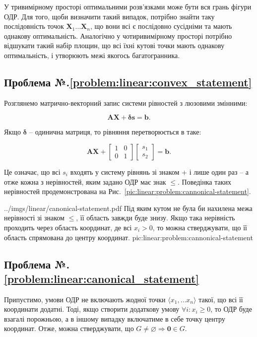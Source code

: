 \documentclass[\main/book.tex]{subfiles}
\begin{document}
У тривимірному просторі оптимальними розв'язками може бути вся грань фігури ОДР. Для того, щоби визначити такий випадок, потрібно знайти таку послідовність точок $\mathbf{X}_1 \ldots \mathbf{X}_n$, що вони всі є послідовно сусідніми та мають однакову оптимальність. Аналогічно у чотиривимірному просторі потрібно відшукати такий набір площин, що всі їхні кутові точки мають однакову оптимальність, і утворюють межі якогось багатогранника.

\subsection*{Проблема №.\ref{problem:linear:convex_statement}}

Розглянемо матрично-векторний запис системи рівностей з люзовими змінними:

\[
 \mathbf{A} \mathbf{X} + \mathbf{\delta} \mathbf{s} = \mathbf{b}
 \text{.}
\]

Якщо $\mathbf{\delta}$ -- одинична матриця, то рівняння перетворюється в таке:


\[
 \mathbf{A} \mathbf{X} +
 \left[
  \begin{array}{cc}
   1 & 0 \\
   0 & 1
  \end{array}
 \right]
 \left[
  \begin{array}{c}
   s_1 \\
   s_2
  \end{array}
 \right] = \mathbf{b}\text{.}
\]

Це означає, що всі $s_i$ входять у систему рівнянь зі знаком \flqq{}$+$\frqq{} і лише один раз -- а отже кожна з нерівностей, яким задано ОДР має знак \flqq{}$\leq$\frqq{}. Поведінка таких нерівностей продемонстрована на Рис.~\ref{pic:linear:problem:cannonical-statement}.

\illustration
 {../imgs/linear/canonical-statement.pdf}
 {Під яким кутом не була би нахилена межа нерівності зі знаком \flqq{}$\leq$\frqq{}, її область завжди буде знизу. Якщо така нерівність проходить через область координат, де всі $x_i > 0$, то можна стверджувати, що її область спрямована до центру координат.}
 {pic:linear:problem:cannonical-statement}

\subsection*{Проблема №.\ref{problem:linear:canonical_statement}}

Припустимо, умови ОДР не включають жодної точки $\langle x_1, \ldots x_n \rangle$ такої, що всі її координати додатні. Тоді, якщо створити додаткову умову $\forall i: x_i \geq 0$, то ОДР буде взагалі порожньою, а в іншому випадку включатиме в себе точку центру координат. Отже, можна стверджувати, що $G \neq \varnothing \Rightarrow \mathbf{0} \in G$.
\end{document}
